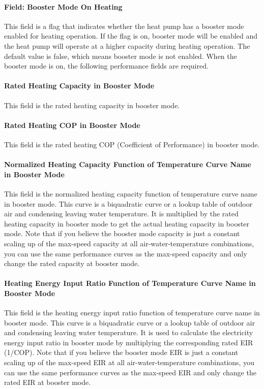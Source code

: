 \paragraph{Field: Booster Mode On Heating} This field is a flag that indicates
whether the heat pump has a booster mode enabled for heating operation. If the
flag is on, booster mode will be enabled and the heat pump will operate at a
higher capacity during heating operation. The default value is false, which
means booster mode is not enabled. When the booster mode is on, the following
performance fields are required.
\paragraph{Rated Heating Capacity in Booster Mode} This field is the rated
heating capacity in booster mode.
\paragraph{Rated Heating COP in Booster Mode} This field is the rated heating
COP (Coefficient of Performance) in booster mode.
\paragraph{Normalized Heating Capacity Function of Temperature Curve Name in
Booster Mode} This field is the normalized heating capacity function of
temperature curve name in booster mode. This curve is a biquadratic curve or a
lookup table of outdoor air and condensing leaving water temperature. It is
multiplied by the rated heating capacity in booster mode to get the actual
heating capacity in booster mode. Note that if you believe the booster mode
capacity is just a constant scaling up of the max-speed capacity at all
air-water-temperature combinations, you can use the same performance curves as
the max-speed capacity and only change the rated capacity at booster mode.
\paragraph{Heating Energy Input Ratio Function of Temperature Curve Name in
Booster Mode} This field is the heating energy input ratio function of
temperature curve name in booster mode. This curve is a biquadratic curve or a
lookup table of outdoor air and condensing leaving water temperature. It is used
to calculate the electricity energy input ratio in booster mode by multiplying
the corresponding rated EIR (1/COP). Note that if you believe the booster mode
EIR is just a constant scaling up of the max-speed EIR at all
air-water-temperature combinations, you can use the same performance curves as
the max-speed EIR and only change the rated EIR at booster mode.
